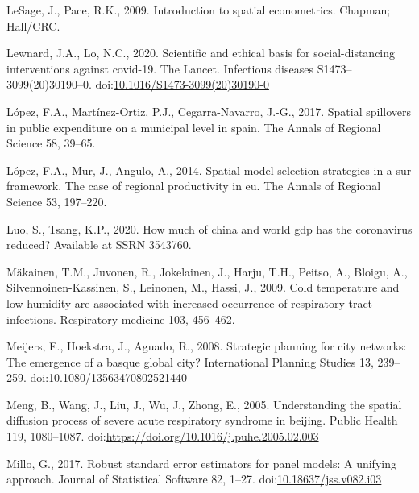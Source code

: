 \documentclass[]{elsarticle} %
\begin{document}
\leavevmode\hypertarget{ref-LeSage2009introduction}{}%
LeSage, J., Pace, R.K., 2009. Introduction to spatial econometrics.
Chapman; Hall/CRC.

\leavevmode\hypertarget{ref-Lewnard2020scientific}{}%
Lewnard, J.A., Lo, N.C., 2020. Scientific and ethical basis for
social-distancing interventions against covid-19. The Lancet. Infectious
diseases S1473--3099(20)30190--0.
doi:\href{https://doi.org/10.1016/S1473-3099(20)30190-0}{10.1016/S1473-3099(20)30190-0}

\leavevmode\hypertarget{ref-Lopez2017spatial}{}%
López, F.A., Martínez-Ortiz, P.J., Cegarra-Navarro, J.-G., 2017. Spatial
spillovers in public expenditure on a municipal level in spain. The
Annals of Regional Science 58, 39--65.

\leavevmode\hypertarget{ref-Lopez2014spatial}{}%
López, F.A., Mur, J., Angulo, A., 2014. Spatial model selection
strategies in a sur framework. The case of regional productivity in eu.
The Annals of Regional Science 53, 197--220.

\leavevmode\hypertarget{ref-Luo2020how}{}%
Luo, S., Tsang, K.P., 2020. How much of china and world gdp has the
coronavirus reduced? Available at SSRN 3543760.

\leavevmode\hypertarget{ref-Makinen2009cold}{}%
Mäkainen, T.M., Juvonen, R., Jokelainen, J., Harju, T.H., Peitso, A.,
Bloigu, A., Silvennoinen-Kassinen, S., Leinonen, M., Hassi, J., 2009.
Cold temperature and low humidity are associated with increased
occurrence of respiratory tract infections. Respiratory medicine 103,
456--462.

\leavevmode\hypertarget{ref-Meijers2008strategic}{}%
Meijers, E., Hoekstra, J., Aguado, R., 2008. Strategic planning for city
networks: The emergence of a basque global city? International Planning
Studies 13, 239--259.
doi:\href{https://doi.org/10.1080/13563470802521440}{10.1080/13563470802521440}

\leavevmode\hypertarget{ref-Meng2005understanding}{}%
Meng, B., Wang, J., Liu, J., Wu, J., Zhong, E., 2005. Understanding the
spatial diffusion process of severe acute respiratory syndrome in
beijing. Public Health 119, 1080--1087.
doi:\href{https://doi.org/https://doi.org/10.1016/j.puhe.2005.02.003}{https://doi.org/10.1016/j.puhe.2005.02.003}

\leavevmode\hypertarget{ref-Millo2017robust}{}%
Millo, G., 2017. Robust standard error estimators for panel models: A
unifying approach. Journal of Statistical Software 82, 1--27.
doi:\href{https://doi.org/10.18637/jss.v082.i03}{10.18637/jss.v082.i03}
\end{document}
